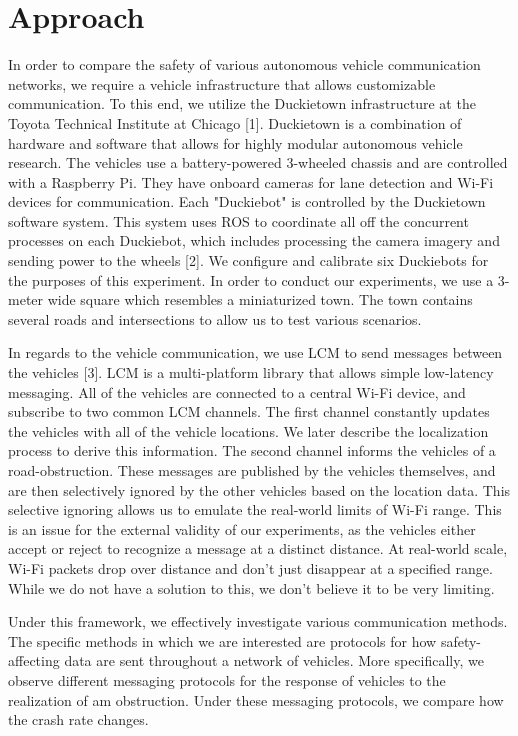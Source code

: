 \section{Approach}
\label{sec:solution}

In order to compare the safety of various autonomous vehicle communication networks, we require a vehicle infrastructure that allows customizable communication. To this end, we utilize the Duckietown infrastructure at the Toyota Technical Institute at Chicago [1]. Duckietown is a combination of hardware and software that allows for highly modular autonomous vehicle research. The vehicles use a battery-powered 3-wheeled chassis and are controlled with a Raspberry Pi. They have onboard cameras for lane detection and Wi-Fi devices for communication. Each "Duckiebot" is controlled by the Duckietown software system. This system uses ROS to coordinate all off the concurrent processes on each Duckiebot, which includes processing the camera imagery and sending power to the wheels [2]. We configure and calibrate six Duckiebots for the purposes of this experiment. In order to conduct our experiments, we use a 3-meter wide square which resembles a miniaturized town. The town contains several roads and intersections to allow us to test various scenarios.

In regards to the vehicle communication, we use LCM to send messages between the vehicles [3]. LCM is a multi-platform library that allows simple low-latency messaging. All of the vehicles are connected to a central Wi-Fi device, and subscribe to two common LCM channels. The first channel constantly updates the vehicles with all of the vehicle locations. We later describe the localization process to derive this information. The second channel informs the vehicles of a road-obstruction. These messages are published by the vehicles themselves, and are then selectively ignored by the other vehicles based on the location data. This selective ignoring allows us to emulate the real-world limits of Wi-Fi range. This is an issue for the external validity of our experiments, as the vehicles either accept or reject to recognize a message at a distinct distance. At real-world scale, Wi-Fi packets drop over distance and don't just disappear at a specified range. While we do not have a solution to this, we don't believe it to be very limiting.

Under this framework, we effectively investigate various communication methods. The specific methods in which we are interested are protocols for how safety-affecting data are sent throughout a network of vehicles. More specifically, we observe different messaging protocols for the response of vehicles to the realization of am obstruction. Under these messaging protocols, we compare how the crash rate changes.

